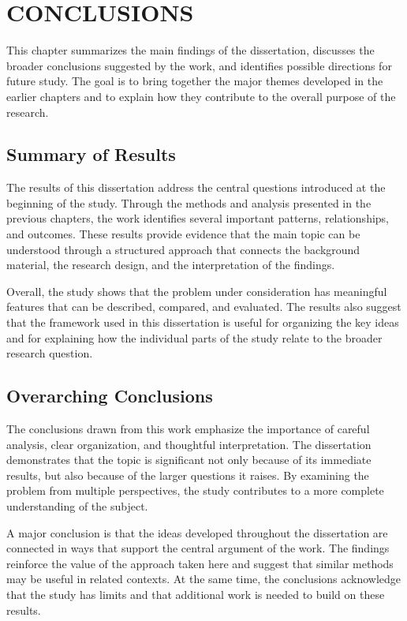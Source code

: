 \chapter{CONCLUSIONS}
\label{chap:six}

This chapter summarizes the main findings of the dissertation, discusses the broader conclusions suggested by the work, and identifies possible directions for future study. The goal is to bring together the major themes developed in the earlier chapters and to explain how they contribute to the overall purpose of the research.

\section{Summary of Results}
\label{sec:summ}

The results of this dissertation address the central questions introduced at the beginning of the study. Through the methods and analysis presented in the previous chapters, the work identifies several important patterns, relationships, and outcomes. These results provide evidence that the main topic can be understood through a structured approach that connects the background material, the research design, and the interpretation of the findings.

Overall, the study shows that the problem under consideration has meaningful features that can be described, compared, and evaluated. The results also suggest that the framework used in this dissertation is useful for organizing the key ideas and for explaining how the individual parts of the study relate to the broader research question.

\section{Overarching Conclusions}
\label{sec:conc}

The conclusions drawn from this work emphasize the importance of careful analysis, clear organization, and thoughtful interpretation. The dissertation demonstrates that the topic is significant not only because of its immediate results, but also because of the larger questions it raises. By examining the problem from multiple perspectives, the study contributes to a more complete understanding of the subject.

A major conclusion is that the ideas developed throughout the dissertation are connected in ways that support the central argument of the work. The findings reinforce the value of the approach taken here and suggest that similar methods may be useful in related contexts. At the same time, the conclusions acknowledge that the study has limits and that additional work is needed to build on these results.

